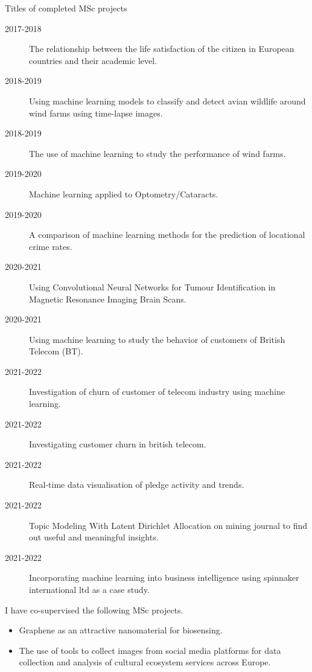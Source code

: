 \documentclass[12pt]{article}
\begin{document}
Titles of completed MSc projects
\begin{description}

\item[2017-2018] The relationship between the life satisfaction of the
citizen in European countries and their academic level.

\item[2018-2019] Using machine learning models to classify and detect
  avian wildlife around wind farms using time-lapse images.

\item[2018-2019] The use of machine learning to study the performance
  of wind farms.

\item[2019-2020] Machine learning applied to Optometry/Cataracts.

\item[2019-2020] A comparison of machine learning methods for the
  prediction of locational crime rates.

\item[2020-2021] Using Convolutional Neural Networks
for Tumour Identification in
Magnetic Resonance Imaging
Brain Scans.


\item[2020-2021] Using machine learning to study the behavior of
  customers of British Telecom (BT). 

\item[2021-2022] Investigation of churn of customer of telecom
  industry using machine learning.


\item[2021-2022] Investigating customer churn in british telecom.

\item[2021-2022] Real-time data visualisation of pledge activity and trends.

\item[2021-2022] Topic Modeling With Latent Dirichlet Allocation on  mining journal to find out useful and meaningful insights.

\item[2021-2022] Incorporating machine learning into business
  intelligence using spinnaker international ltd as a case study.


\end{description}

I have co-supervised the following MSc projects.

\begin{itemize}

\item  Graphene as an attractive nanomaterial for biosensing.

\item The use of tools to collect images from social media
platforms for data collection and analysis of cultural
ecosystem services across Europe.

\end{itemize}
\end{document}

